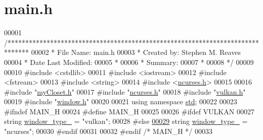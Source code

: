 \hypertarget{main_8h_source}{}\section{main.\+h}

\begin{DoxyCode}
00001 \textcolor{comment}{/******************************************************************************}
00002 \textcolor{comment}{ * File Name: main.h}
00003 \textcolor{comment}{ * Created by: Stephen M. Reaves}
00004 \textcolor{comment}{ * Date Last Modified:}
00005 \textcolor{comment}{ *}
00006 \textcolor{comment}{ * Summary:}
00007 \textcolor{comment}{ *}
00008 \textcolor{comment}{ */}
00009 
00010 \textcolor{preprocessor}{#include <cstdlib>}
00011 \textcolor{preprocessor}{#include <iostream>}
00012 \textcolor{preprocessor}{#include <fstream>}
00013 \textcolor{preprocessor}{#include <string>}
00014 \textcolor{preprocessor}{#include <\mbox{\hyperlink{ncurses_8h}{ncurses.h}}>}
00015 
00016 \textcolor{preprocessor}{#include "\mbox{\hyperlink{myCloset_8h}{myCloset.h}}"}
00017 \textcolor{preprocessor}{#include "\mbox{\hyperlink{ncurses_8h}{ncurses.h}}"}
00018 \textcolor{preprocessor}{#include "\mbox{\hyperlink{vulkan_8h}{vulkan.h}}"}
00019 \textcolor{preprocessor}{#include "\mbox{\hyperlink{window_8h}{window.h}}"}
00020 
00021 \textcolor{keyword}{using namespace }\mbox{\hyperlink{namespacestd}{std}};
00022 
00023 \textcolor{preprocessor}{#ifndef MAIN\_H}
00024 \textcolor{preprocessor}{#define MAIN\_H}
00025 
00026 \textcolor{preprocessor}{#ifdef VULKAN}
00027 \textcolor{keywordtype}{string} \mbox{\hyperlink{main_8h_a9c6bd0ef77b9f23b249fedfd6f669d8a}{window\_type\_}} = \textcolor{stringliteral}{"vulkan"};
00028 \textcolor{preprocessor}{#else}
\mbox{\hyperlink{main_8h_a9c6bd0ef77b9f23b249fedfd6f669d8a}{00029}} \textcolor{keywordtype}{string} \mbox{\hyperlink{main_8h_a9c6bd0ef77b9f23b249fedfd6f669d8a}{window\_type\_}} = \textcolor{stringliteral}{"ncurses"};
00030 \textcolor{preprocessor}{#endif}
00031 
00032 \textcolor{preprocessor}{#endif }\textcolor{comment}{/* MAIN\_H */}\textcolor{preprocessor}{}
00033 
\end{DoxyCode}

